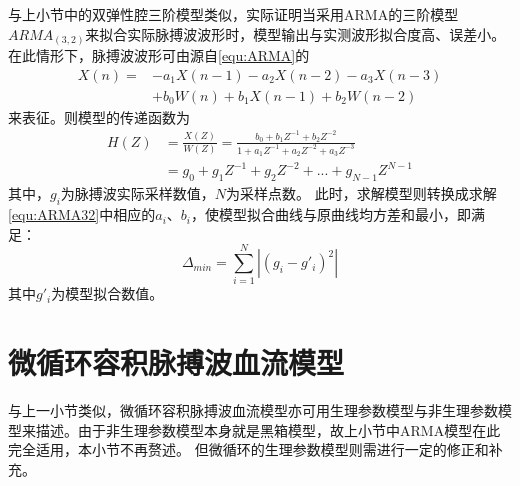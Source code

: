 与上小节中的双弹性腔三阶模型类似，实际证明当采用ARMA的三阶模型$ARMA_{(3,2)}$来拟合实际脉搏波波形时，模型输出与实测波形拟合度高、误差小\cite{PPGYY}。在此情形下，脉搏波波形可由源自\autoref{equ:ARMA}的
\begin{equation}
    \label{equ:ARMA32}
    \begin{aligned}
        X(n)=&-a_{1}X(n-1)-a_{2}X(n-2)-a_{3}X(n-3)\\
        &+b_{0}W(n)+b_{1}X(n-1)+b_{2}W(n-2)
    \end{aligned}
\end{equation}
来表征。则模型的传递函数为
\begin{equation}
    \label{equ:ARMAH32}
    \begin{aligned}
        H(Z)&=\frac{X(Z)}{W(Z)}=\frac{b_{0}+b_{1}Z^{-1}+b_{2}Z^{-2}}{1+a_{1}Z^{-1}+a_{2}Z^{-2}+a_{3}Z^{-3}}\\
        &=g_{0}+g_{1}Z^{-1}+g_{2}Z^{-2}+...+g_{N-1}Z^{N-1}
    \end{aligned}
\end{equation}
其中，$g_{i}$为脉搏波实际采样数值，$N$为采样点数。
此时，求解模型则转换成求解\autoref{equ:ARMA32}中相应的$a_{i}$、$b_{i}$，使模型拟合曲线与原曲线均方差和最小，即满足：
\begin{equation}
    \label{equ:MeanSum}
    \Delta_{min}=\sum_{i=1}^{N}\left |  (g_i-g'_i)^2\right |
\end{equation}
其中$g'_i$为模型拟合数值。
\section{微循环容积脉搏波血流模型}
与上一小节类似，微循环容积脉搏波血流模型亦可用生理参数模型与非生理参数模型来描述。由于非生理参数模型本身就是黑箱模型，故上小节中ARMA模型在此完全适用，本小节不再赘述。
但微循环的生理参数模型则需进行一定的修正和补充。


